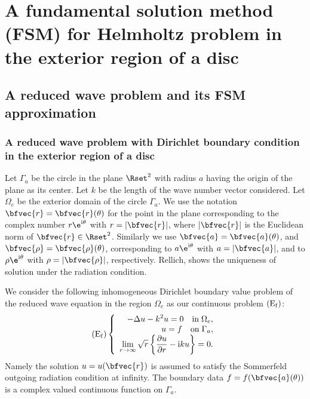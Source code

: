\chapter{A fundamental solution method (FSM) for Helmholtz problem in the exterior region of a disc}
\label{chapter fsm}

\section{A reduced wave problem and its FSM approximation}
\label{fsm}
\subsection{A reduced wave problem with Dirichlet boundary condition in the exterior region of a disc}
Let $\Gamma_a$ be the circle in the plane $\Rset^2$ with radius $a$ having the origin of the plane as its center. Let $k$ be the length of the wave number vector considered. Let $\Omega_e$ be the exterior domain of the circle $\Gamma_a$. We use the notation $\bfvec{r}=\bfvec{r}(\theta)$ for the point in the plane corresponding to the complex number $r \e^{\mathrm{i}\theta}$ with $r=|\bfvec{r}|$, where $|\bfvec{r}|$ is the Euclidean norm of $\bfvec{r}\in\Rset^2$. Similarly we use $\bfvec{a}=\bfvec{a}(\theta)$, and $\bfvec{\rho}=\bfvec{\rho}(\theta)$, corresponding to $a \e^{\mathrm{i}\theta}$ with $a=|\bfvec{a}|$, and to $\rho \e^{\mathrm{i}\theta}$ with $\rho=|\bfvec{\rho}|$, respectively.
Rellich\cite{Rellich},\cite{Sommerfeld} shows the uniqueness of solution under the radiation condition. %

We consider the following inhomogeneous Dirichlet boundary value problem of the reduced wave equation in the region $\Omega_e$ as our continuous problem ${\rm (E_f)}$:
\begin{eqnarray*}
{\rm (E_f)}
\left\{
\begin{array}{r}
\displaystyle -\Delta u -k^2 u = 0 \quad {\rm in} \; \Omega_e,\\
\displaystyle u=f \quad {\rm on} \; \Gamma_a, \\
\displaystyle \lim_{r \rightarrow \infty} \sqrt{r} \left\{\frac{\partial u}{\partial r}- \mathrm{i} k u \right\}=0.
\end{array}
\right.
\end{eqnarray*}
Namely the solution $u=u(\bfvec{r})$ is assumed to satisfy the Sommerfeld outgoing radiation condition at infinity. The boundary data $f=f(\bfvec{a}(\theta))$ is a complex valued continuous function on $\Gamma_a$.

